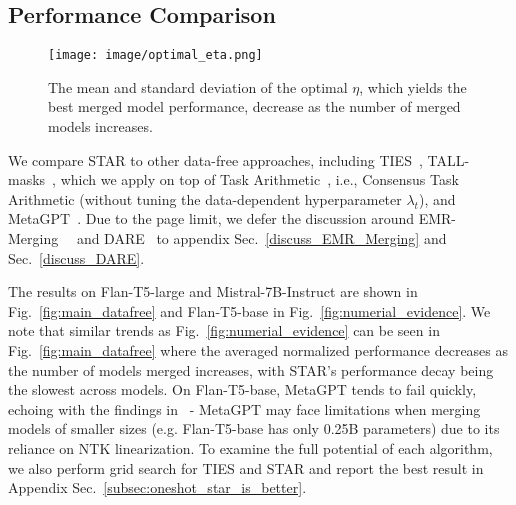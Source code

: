 \subsection{Performance Comparison}\label{exp_results}
\begin{figure}[t]
    \centering
    \texttt{[image: image/optimal\_eta.png]}
    \caption{The mean and standard deviation of the optimal \( \eta \), which yields the best merged model performance, decrease as the number of merged models increases.} 
    \vspace{-1em}
    \label{fig:optimal_eta}
\end{figure}
We compare STAR to other data-free approaches, including TIES~\cite{yadav2024ties}, TALL-masks~\cite{wang2024localizing}, which we apply on top of Task Arithmetic~\cite{ilharco2022editing}, i.e., Consensus Task Arithmetic (without tuning the data-dependent hyperparameter \( \lambda_{t} \)), and MetaGPT~\cite{zhou2024metagpt}. Due to the page limit, we defer the discussion around EMR-Merging~~\cite{huang2024emr} and DARE~\cite{yu2024language} to appendix Sec.~\ref{discuss_EMR_Merging} and Sec.~\ref{discuss_DARE}.

The results on Flan-T5-large and Mistral-7B-Instruct are shown in Fig.~\ref{fig:main_datafree} and Flan-T5-base in Fig.~\ref{fig:numerial_evidence}. We note that similar trends as Fig.~\ref{fig:numerial_evidence} can be seen in Fig.~\ref{fig:main_datafree} where the averaged normalized performance decreases as the number of models merged increases, with STAR's performance decay being the slowest across models. On Flan-T5-base, MetaGPT tends to fail quickly, echoing with the findings in~\cite{zhou2024metagpt} - 
MetaGPT may face limitations when merging models of smaller sizes (e.g. Flan-T5-base has only 0.25B parameters) due to its reliance on NTK linearization. 
To examine the full potential of each algorithm, we also perform grid search for TIES and STAR and report the best result in Appendix Sec.~\ref{subsec:oneshot_star_is_better}.